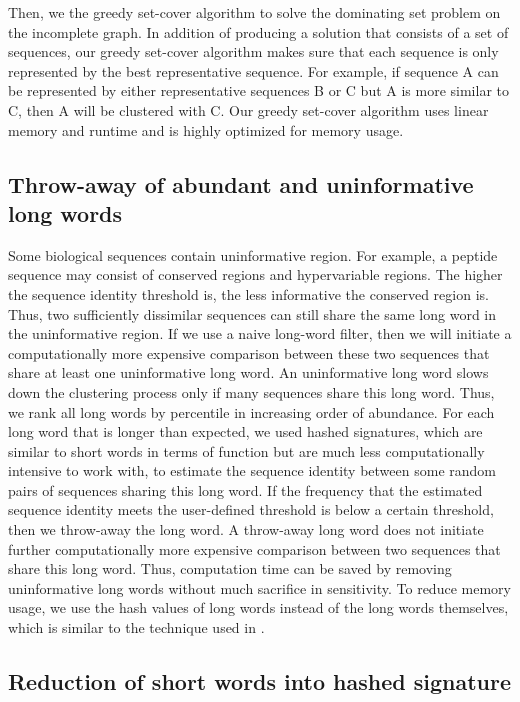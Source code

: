 \documentclass[11pt,letterpaper]{article}
\begin{document}
Then, we the greedy set-cover algorithm to solve the dominating set problem on the incomplete graph.
In addition of producing a solution that consists of a set of sequences, 
our greedy set-cover algorithm makes sure that each sequence is only represented by the best representative sequence.
For example, if sequence A can be represented by either representative sequences B or C but A is more similar to C,
then A will be clustered with C.
Our greedy set-cover algorithm uses linear memory and runtime and is highly optimized for memory usage.

\subsection{Throw-away of abundant and uninformative long words}

Some biological sequences contain uninformative region.
For example, a peptide sequence may consist of conserved regions and hypervariable regions.
The higher the sequence identity threshold is, the less informative the conserved region is.
Thus, two sufficiently dissimilar sequences can still share the same long word in the uninformative region.
If we use a naive long-word filter, then we will initiate a computationally more expensive comparison between these two sequences that share at least one uninformative long word.
An uninformative long word slows down the clustering process only if many sequences share this long word.
Thus, we rank all long words by percentile in increasing order of abundance.
For each long word that is longer than expected, we used hashed signatures, which are similar to short words in terms of function but are much less computationally intensive to work with, to estimate the sequence identity between some random pairs of sequences sharing this long word.
If the frequency that the estimated sequence identity meets the user-defined threshold is below a certain threshold,
then we throw-away the long word.
A throw-away long word does not initiate further computationally more expensive comparison between two sequences that share this long word.
Thus, computation time can be saved by removing uninformative long words without much sacrifice in sensitivity.
To reduce memory usage, we use the hash values of long words instead of the long words themselves, which is similar to the technique used in \citet{steinegger2017Linclust}.

\subsection{Reduction of short words into hashed signature}
\end{document}
